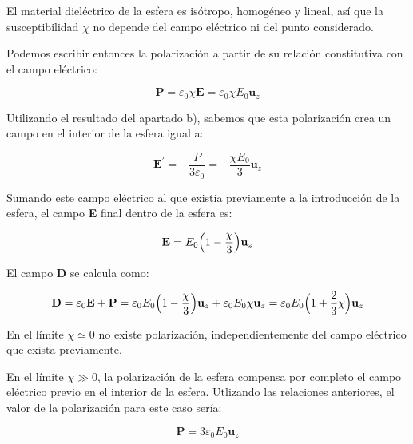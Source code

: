 \begin{enumerate}
    El material dieléctrico de la esfera es isótropo, homogéneo y lineal, así que la susceptibilidad $\chi$ no depende del campo
    eléctrico ni del punto considerado.

    Podemos escribir entonces la polarización a partir de su relación constitutiva con el campo eléctrico:

    \begin{equation*}
        \mathbf{P} = \varepsilon_0 \chi \mathbf{E} = \varepsilon_0 \chi E_0 \mathbf{u}_z
    \end{equation*}

    Utilizando el resultado del apartado b), sabemos que esta polarización crea un campo en el interior de la esfera igual a:

    \begin{equation*}
        \mathbf{E^\prime} = - \frac{P}{3 \varepsilon_0} = - \frac{\chi E_0}{3} \mathbf{u}_z
    \end{equation*}

    Sumando este campo eléctrico al que existía previamente a la introducción de la esfera, el campo \textbf{E} final dentro
    de la esfera es:

    \begin{equation*}
        \mathbf{E} = E_0 \Bigl( 1 - \frac{\chi}{3} \Bigr) \mathbf{u}_z
    \end{equation*}

    El campo \textbf{D} se calcula como:

    \begin{equation*}
        \mathbf{D} = \varepsilon_0 \mathbf{E} + \mathbf{P} =
        \varepsilon_0 E_0 \Bigl( 1 - \frac{\chi}{3} \Bigr) \mathbf{u}_z +  \varepsilon_0 E_0 \chi \mathbf{u}_z =
        \varepsilon_0 E_0 \Bigl( 1 + \frac{2}{3} \chi \Bigr) \mathbf{u}_z
    \end{equation*}


    En el límite $\chi \simeq 0$ no existe polarización, independientemente del campo eléctrico que exista previamente.

    En el límite $\chi \gg 0$, la polarización de la esfera compensa por completo el campo eléctrico previo en el interior de la esfera. Utlizando las
    relaciones anteriores, el valor de la polarización para este caso sería:

    \begin{equation*}
        \mathbf{P} = 3 \varepsilon_0 E_0 \mathbf{u}_z
    \end{equation*}

\end{enumerate}